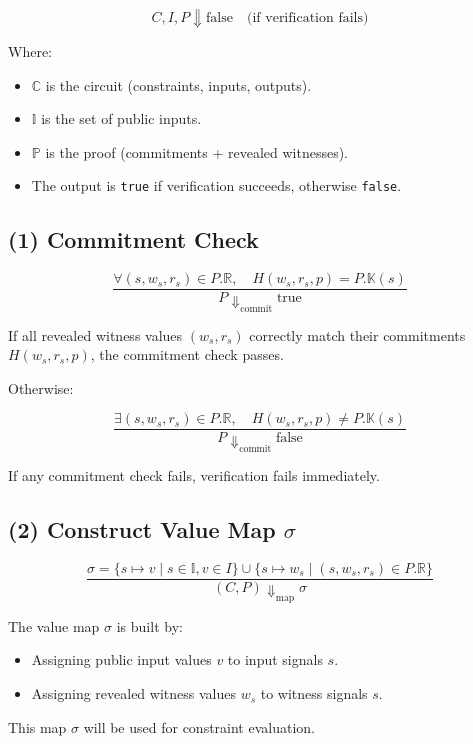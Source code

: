 \documentclass{article}
\begin{document}
\[
C, I, P \Downarrow \text{false} \quad \text{(if verification fails)}
\]

Where:

\begin{itemize}
    \item $\mathbb{C}$ is the circuit (constraints, inputs, outputs).
    \item $\mathbb{I}$ is the set of public inputs.
    \item $\mathbb{P}$ is the proof (commitments + revealed witnesses).
    \item The output is \texttt{true} if verification succeeds, otherwise \texttt{false}.
\end{itemize}

\subsection{(1) Commitment Check}

\[
\frac{ \forall (s, w_s, r_s) \in P.\mathbb{R}, \quad H(w_s, r_s, p) = P.\mathbb{K}(s) }
{ P \Downarrow_{\text{commit}} \text{true} }
\]

If all revealed witness values $(w_s, r_s)$ correctly match their commitments $H(w_s, r_s, p)$, the commitment check passes.

Otherwise:

\[
\frac{ \exists (s, w_s, r_s) \in P.\mathbb{R}, \quad H(w_s, r_s, p) \neq P.\mathbb{K}(s) }
{ P \Downarrow_{\text{commit}} \text{false} }
\]

If any commitment check fails, verification fails immediately.


\subsection{(2) Construct Value Map $\sigma$}

\[
\frac{ \sigma = \{ s \mapsto v \mid s \in \mathbb{I}, v \in I \} \cup \{ s \mapsto w_s \mid (s, w_s, r_s) \in P.\mathbb{R} \} }
{ (C, P) \Downarrow_{\text{map}} \sigma }
\]

The value map $\sigma$ is built by:

\begin{itemize}
    \item Assigning public input values $v$ to input signals $s$.
    \item Assigning revealed witness values $w_s$ to witness signals $s$.
\end{itemize}

This map $\sigma$ will be used for constraint evaluation.
\end{document}
